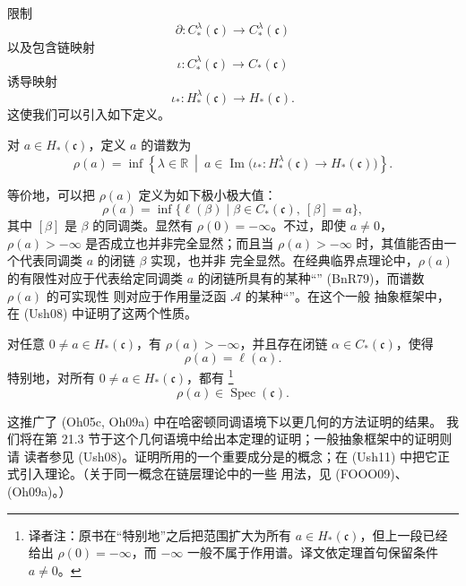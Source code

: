 限制
\[
  \partial:C_*^\lambda(\mathfrak c)\longrightarrow
  C_*^\lambda(\mathfrak c)
\]
以及包含链映射
\[
  \iota:C_*^\lambda(\mathfrak c)\longrightarrow C_*(\mathfrak c)
\]
诱导映射
\[
  \iota_*:H_*^\lambda(\mathfrak c)\longrightarrow H_*(\mathfrak c).
\]
这使我们可以引入如下定义。

\begin{definition}
\label{def:abstract-spectral-number}
对 $a\in H_*(\mathfrak c)$，定义 $a$ 的谱数为
\[
  \rho(a)
  =\inf\left\{
    \lambda\in\mathbb R
    \ \middle|\
    a\in\operatorname{Im}\bigl(
      \iota_*:H_*^\lambda(\mathfrak c)\to H_*(\mathfrak c)
    \bigr)
  \right\}.
\]
\end{definition}

等价地，可以把 $\rho(a)$ 定义为如下极小极大值：
\begin{equation}
  \rho(a)
  =\inf\{\ell(\beta)\mid
    \beta\in C_*(\mathfrak c),\ [\beta]=a\},
\label{eq:abstract-spectral-number-minimax}
\end{equation}
其中 $[\beta]$ 是 $\beta$ 的同调类。显然有 $\rho(0)=-\infty$。不过，即使
$a\ne0$，$\rho(a)>-\infty$ 是否成立也并非完全显然；而且当
$\rho(a)>-\infty$ 时，其值能否由一个代表同调类 $a$ 的闭链 $\beta$ 实现，也并非
完全显然。在经典临界点理论中，$\rho(a)$ 的有限性对应于代表给定同调类 $a$
的闭链所具有的某种“\termLinkingProperty{}” (BnR79)，而谱数 $\rho(a)$ 的可实现性
则对应于作用量泛函 $\mathcal A$ 的某种“\termPalaisSmaleCondition{}”。在这个一般
抽象框架中，\personUsher{}在 (Ush08) 中证明了这两个性质。

\begin{theorem}
\label{thm:usher-abstract-spectrality}
对任意 $0\ne a\in H_*(\mathfrak c)$，有 $\rho(a)>-\infty$，并且存在闭链
$\alpha\in C_*(\mathfrak c)$，使得
\[
  \rho(a)=\ell(\alpha).
\]
特别地，对所有 $0\ne a\in H_*(\mathfrak c)$，都有
\footnote{译者注：原书在“特别地”之后把范围扩大为所有
$a\in H_*(\mathfrak c)$，但上一段已经给出 $\rho(0)=-\infty$，而
$-\infty$ 一般不属于作用谱。译文依定理首句保留条件 $a\ne0$。}
\[
  \rho(a)\in\operatorname{Spec}(\mathfrak c).
\]
\end{theorem}

这推广了 (Oh05c, Oh09a) 中在哈密顿\personFloer{}同调语境下以更几何的方法证明的结果。
我们将在第 21.3 节于这个几何语境中给出本定理的证明；一般抽象框架中的证明则请
读者参见 (Ush08)。证明所用的一个重要成分是\termBoundaryDepth{}的概念；\personUsher{}在 (Ush11) 中把它正式引入\personFloer{}理论。（关于同一概念在链层\personFloer{}理论中的一些
用法，见 (FOOO09)、(Oh09a)。）

